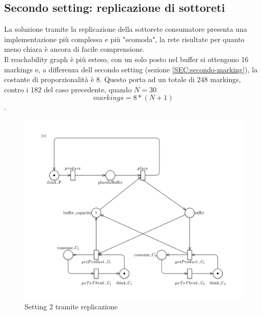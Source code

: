 \documentclass{article}
\begin{document}
\subsection{Secondo  setting: replicazione di sottoreti}\label{SEC:secondo-replica}
La soluzione tramite la replicazione della sottorete consumatore presenta una implementazione più complessa e più "scomoda", la rete risultate per quanto meno chiara è ancora di facile comprensione.\\
Il reachability graph è più esteso, con un solo posto nel buffer si ottengono 16 markings e, a differenza dell secondo setting (sezione \ref{SEC:secondo-marking}), la costante di proporzionalità è 8.
Questo porta ad un totale di 248 markings, contro i 182 del caso precedente, quando $N = 30$
$$markings = 8*(N+1)$$.
\begin{figure}[!ht]
\centering
\includegraphics[width=\textwidth]{./Esercizio2_img/setting2_scale.png}
\caption{Setting 2 tramite replicazione} \label{FIG:setting2_scale}
\end{figure}

\newpage
\end{document}
